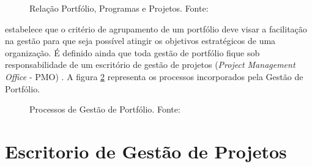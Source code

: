 \begin{figure}[ht]
  \centering
  \caption{Relação Portfólio, Programas e Projetos. Fonte: \cite{pmi2006}}
  \label{port_prog_proj}
\end{figure}

 estabelece que o critério de agrupamento de um portfólio deve visar a facilitação na gestão para que seja possível atingir os objetivos estratégicos de uma organização. É definido ainda que toda gestão de portfólio fique sob responsabilidade de um escritório de gestão de projetos (\textit{Project Management Office} - PMO)  . A figura \ref{estrategia_portfolio} representa os processos incorporados pela Gestão de Portfólio.

\begin{figure}[ht]
  \centering
  \caption{Processos de Gestão de Portfólio. Fonte: \cite{pmi2006}}
  \label{estrategia_portfolio}
\end{figure}

\section{Escritorio de Gestão de Projetos}

